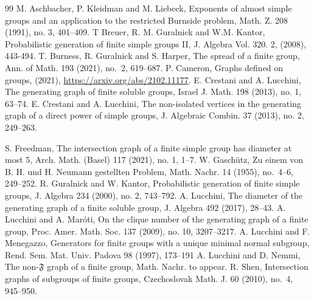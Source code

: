 \documentclass{amsart}
\numberwithin{equation}{section}
\begin{document}
\begin{thebibliography}{99}
	 M. Aschbacher, P. Kleidman and M. Liebeck, Exponents of almost simple groups and an application to the restricted Burnside problem, Math. Z. 208 (1991), no. 3, 401--409.
 T Breuer, R. M. Guralnick and W.M. Kantor, 
Probabilistic generation of finite simple groups II, {J.
	Algebra} Vol. 320. {2}, (2008), 443-494.
T. Burness, R. Guralnick and S. Harper, {The spread of
	a finite group}, Ann. of Math. {193} (2021), no.~2, 619--687.
P. Cameron, {Graphs defined on groups},  (2021),
\url{https://arxiv.org/abs/2102.11177}.
 E. Crestani and A. Lucchini, The generating graph of finite soluble groups, Israel J. Math. 198 (2013), no. 1, 63--74.
 E. Crestani and A. Lucchini, The non-isolated vertices in the generating graph of a direct power of simple groups,
{J. Algebraic Combin.}  37 (2013), no. 2, 249--263. 

 S. Freedman,  The intersection graph of a finite simple group has diameter at most 5, Arch. Math. (Basel) 117 (2021), no. 1, 1–7.
 W. Gasch\"utz, Zu einem von B. H. und H. Neumann gestellten Problem, Math. Nachr. 14
(1955), no.~4--6, 249--252.
 R. Guralnick and W. Kantor, Probabilistic generation of finite simple groups, J. Algebra 234 (2000), no. 2, 743--792.
 A. Lucchini, The diameter of the generating graph of a finite soluble group, J. Algebra 492 (2017), 28–43. 
  A. Lucchini and A.  Maróti, On the clique number of the generating graph of a finite group, Proc. Amer. Math. Soc. 137 (2009), no. 10, 3207--3217.	
	 A. Lucchini and F. Menegazzo, Generators for finite groups with a unique minimal normal subgroup, Rend. Sem. Mat. Univ. Padova 98 (1997), 173–191
	 A. Lucchini and D. Nemmi, The non-$\mathfrak F$ graph of a finite group, Math. Nachr. to appear.
R. Shen, Intersection graphs of subgroups of finite groups,
Czechoslovak Math. J. 60 (2010), no.~4, 945--950.

\end{thebibliography}
\end{document}
